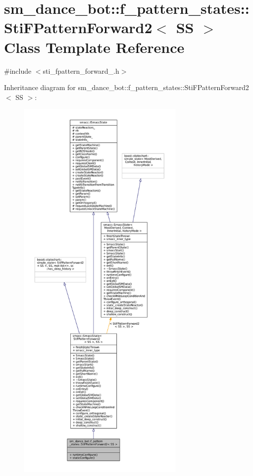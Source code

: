 \hypertarget{structsm__dance__bot_1_1f__pattern__states_1_1StiFPatternForward2}{}\section{sm\+\_\+dance\+\_\+bot\+:\+:f\+\_\+pattern\+\_\+states\+:\+:Sti\+F\+Pattern\+Forward2$<$ SS $>$ Class Template Reference}
\label{structsm__dance__bot_1_1f__pattern__states_1_1StiFPatternForward2}


{\ttfamily \#include $<$sti\+\_\+fpattern\+\_\+forward\+\_.\+h$>$}



Inheritance diagram for sm\+\_\+dance\+\_\+bot\+:\+:f\+\_\+pattern\+\_\+states\+:\+:Sti\+F\+Pattern\+Forward2$<$ SS $>$\+:
\nopagebreak
\begin{figure}[H]
\begin{center}
\leavevmode
\includegraphics[height=550pt]{structsm__dance__bot_1_1f__pattern__states_1_1StiFPatternForward2__inherit__graph}
\end{center}
\end{figure}


